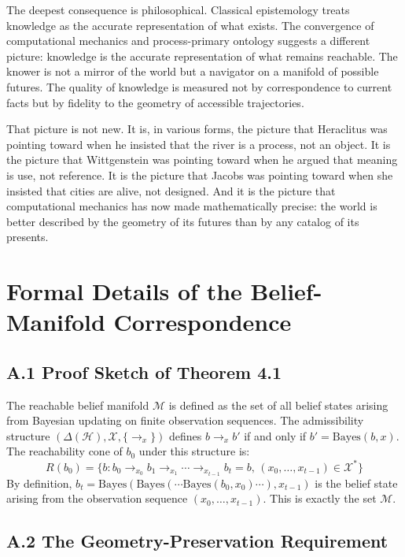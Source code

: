\documentclass[12pt, a4paper]{article}
\theoremstyle{plain}
\theoremstyle{definition}
\theoremstyle{remark}
\begin{document}
The deepest consequence is philosophical. Classical epistemology treats
knowledge as the accurate representation of what exists. The convergence
of computational mechanics and process-primary ontology suggests a
different picture: knowledge is the accurate representation of what
remains reachable. The knower is not a mirror of the world but a navigator
on a manifold of possible futures. The quality of knowledge is measured
not by correspondence to current facts but by fidelity to the geometry
of accessible trajectories.

That picture is not new. It is, in various forms, the picture that
Heraclitus was pointing toward when he insisted that the river is a
process, not an object. It is the picture that Wittgenstein was
pointing toward when he argued that meaning is use, not reference.
It is the picture that Jacobs was pointing toward when she insisted
that cities are alive, not designed. And it is the picture that
computational mechanics has now made mathematically precise:
the world is better described by the geometry of its futures than
by any catalog of its presents.

\newpage
\appendix

\section{Formal Details of the Belief-Manifold Correspondence}
\label{app:formal}

\subsection*{A.1 Proof Sketch of Theorem 4.1}

The reachable belief manifold $\mathcal{M}$ is defined as the set of all
belief states arising from Bayesian updating on finite observation sequences.
The admissibility structure $(\Delta(\mathcal{H}), \mathcal{X}, \{\to_x\})$
defines $b \to_x b'$ if and only if $b' = \text{Bayes}(b, x)$. The
reachability cone of $b_0$ under this structure is:
$$R(b_0) = \{b : b_0 \to_{x_0} b_1 \to_{x_1} \cdots \to_{x_{t-1}} b_t = b,
\, (x_0, \ldots, x_{t-1}) \in \mathcal{X}^*\}$$
By definition, $b_t = \text{Bayes}(\text{Bayes}(\cdots \text{Bayes}(b_0, x_0)
\cdots), x_{t-1})$ is the belief state arising from the observation sequence
$(x_0, \ldots, x_{t-1})$. This is exactly the set $\mathcal{M}$.

\subsection*{A.2 The Geometry-Preservation Requirement}
\end{document}
